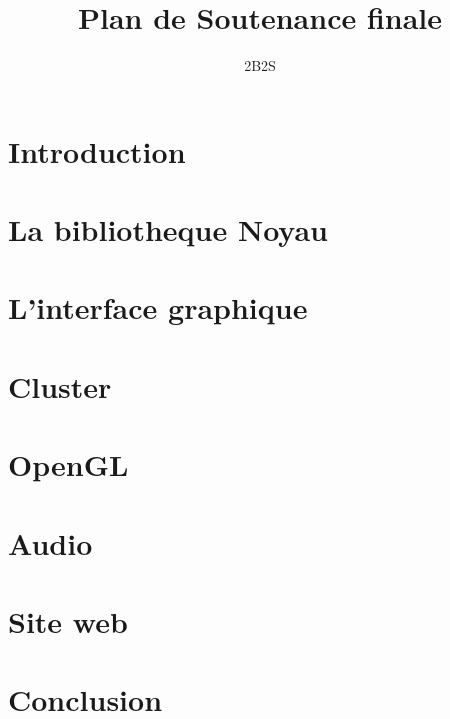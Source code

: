 \documentclass[14pt,a4paper]{article}
\title{\textbf{Plan de Soutenance finale}}
\author{2B2S}
\begin{document}
\maketitle
\rule{0cm}{1mm}
\section{Introduction}
\rule{0cm}{0cm}
\section{La bibliotheque Noyau}
\rule{0cm}{0cm}
\section{L'interface graphique}
\rule{0cm}{0cm}
\section{Cluster}
\rule{0cm}{0cm}
\section{OpenGL}
\rule{0cm}{0cm}
\section{Audio}
\rule{0cm}{0cm}
\section{Site web}
\rule{0cm}{0cm}
\section{Conclusion}
\end{document}
